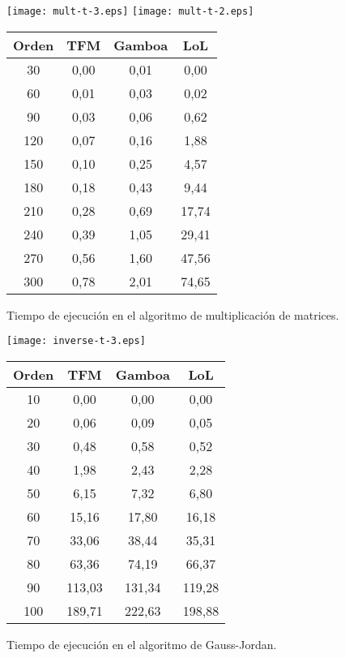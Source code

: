 \documentclass[a4paper,10pt]{article}
\begin{document}
\newpage
\begin{figure}[H]
\begin{center}
	\texttt{[image: mult-t-3.eps]}	
	\texttt{[image: mult-t-2.eps]}	
\begin{tabular}{||c|c|c|c||}
\hline
\textbf{Orden} & \textbf{TFM} & \textbf{Gamboa} & \textbf{LoL} \\
\hline
30 &	0,00 &	0,01 &	0,00 \\
60 &	0,01 &	0,03 &	0,02 \\
90 &	0,03 &	0,06 &	0,62 \\
120 &	0,07 &	0,16 &	1,88 \\
150 &	0,10 &	0,25 &	4,57 \\
180 &	0,18 &	0,43 &	9,44 \\
210 &	0,28 &	0,69 &	17,74 \\
240 &	0,39 &	1,05	& 29,41 \\
270 &	0,56 &	1,60 &	47,56 \\
300 &	0,78 &	2,01 &	74,65 \\
\hline
\end{tabular}
\end{center}
\caption{Tiempo de ejecución en el algoritmo de multiplicación de matrices.}
\end{figure}

\newpage
\begin{figure}[H]
\begin{center}
	\texttt{[image: inverse-t-3.eps]}	
\begin{tabular}{||c|c|c|c||}
\hline
\textbf{Orden} & \textbf{TFM} & \textbf{Gamboa} & \textbf{LoL} \\
\hline
10 &	0,00 &	0,00 &	0,00 \\
20 &	0,06 &	0,09 &	0,05 \\
30 &	0,48 &	0,58 &	0,52 \\
40 &	1,98 &	2,43 &	2,28 \\
50 &	6,15 &	7,32 & 6,80 \\
60 &	15,16 &	17,80 &	16,18  \\
70 &	33,06 &	38,44 &	35,31 \\
80 &	63,36 &	74,19 &	66,37 \\
90 &	113,03 &	131,34 &	119,28 \\
100 &	189,71 &	222,63 &	198,88  \\
\hline
\end{tabular}
\end{center}
\caption{Tiempo de ejecución en el algoritmo de Gauss-Jordan.}
\end{figure}
\end{document}
